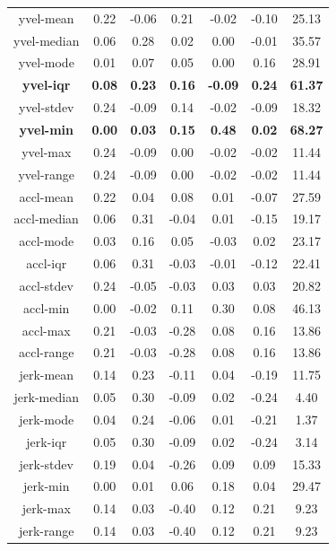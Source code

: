 \begin{table}[h!]
\begin{tabular}{|c|c|c|c|c|c|c|}
		yvel-mean & 0.22 & -0.06 & 0.21 & -0.02 & -0.10 & 25.13 \\
		yvel-median & 0.06 & 0.28 & 0.02 & 0.00 & -0.01 & 35.57 \\
		yvel-mode & 0.01 & 0.07 & 0.05 & 0.00 & 0.16 & 28.91 \\
		\textbf{yvel-iqr} & \textbf{0.08} & \textbf{0.23} & \textbf{0.16} & \textbf{-0.09} & \textbf{0.24} & \textbf{61.37} \\
		yvel-stdev & 0.24 & -0.09 & 0.14 & -0.02 & -0.09 & 18.32 \\
		\textbf{yvel-min} & \textbf{0.00} & \textbf{0.03} & \textbf{0.15} & \textbf{0.48} & \textbf{0.02} & \textbf{68.27} \\
		yvel-max & 0.24 & -0.09 & 0.00 & -0.02 & -0.02 & 11.44 \\
		yvel-range & 0.24 & -0.09 & 0.00 & -0.02 & -0.02 & 11.44 \\
		accl-mean & 0.22 & 0.04 & 0.08 & 0.01 & -0.07 & 27.59 \\
		accl-median & 0.06 & 0.31 & -0.04 & 0.01 & -0.15 & 19.17 \\
		accl-mode & 0.03 & 0.16 & 0.05 & -0.03 & 0.02 & 23.17 \\
		accl-iqr & 0.06 & 0.31 & -0.03 & -0.01 & -0.12 & 22.41 \\
		accl-stdev & 0.24 & -0.05 & -0.03 & 0.03 & 0.03 & 20.82 \\
		accl-min & 0.00 & -0.02 & 0.11 & 0.30 & 0.08 & 46.13 \\
		accl-max & 0.21 & -0.03 & -0.28 & 0.08 & 0.16 & 13.86 \\
		accl-range & 0.21 & -0.03 & -0.28 & 0.08 & 0.16 & 13.86 \\
		jerk-mean & 0.14 & 0.23 & -0.11 & 0.04 & -0.19 & 11.75 \\
		jerk-median & 0.05 & 0.30 & -0.09 & 0.02 & -0.24 & 4.40 \\
		jerk-mode & 0.04 & 0.24 & -0.06 & 0.01 & -0.21 & 1.37 \\
		jerk-iqr & 0.05 & 0.30 & -0.09 & 0.02 & -0.24 & 3.14 \\
		jerk-stdev & 0.19 & 0.04 & -0.26 & 0.09 & 0.09 & 15.33 \\
		jerk-min & 0.00 & 0.01 & 0.06 & 0.18 & 0.04 & 29.47 \\
		jerk-max & 0.14 & 0.03 & -0.40 & 0.12 & 0.21 & 9.23 \\
		jerk-range & 0.14 & 0.03 & -0.40 & 0.12 & 0.21 & 9.23 \\
		\hline
	\end{tabular}
\end{table}

